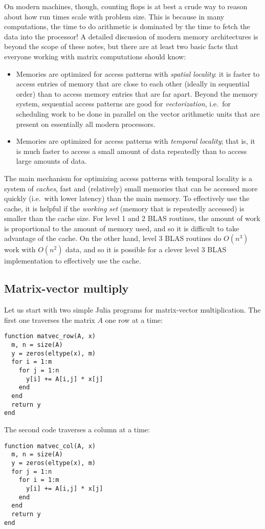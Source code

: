 \documentclass[12pt, leqno]{article}
\begin{document}
On modern machines, though, counting flops is at best a crude way
to reason about how run times scale with problem size.  This is because
in many computations, the time to do arithmetic is dominated by the time
to fetch the data into the processor!  A detailed discussion of modern
memory architectures is beyond the scope of these notes, but there are
at least two basic facts that everyone working with matrix computations
should know:
\begin{itemize}
\item
  Memories are optimized for access patterns with {\em spatial locality}:
  it is faster to access entries of memory that are close to each
  other (ideally in sequential order) than to access memory entries that
  are far apart.  Beyond the memory system, sequential access patterns
  are good for {\em vectorization}, i.e.~for scheduling work to be done
  in parallel on the vector arithmetic units
  that are present on essentially all modern processors.
\item
  Memories are optimized for access patterns with {\em temporal locality};
  that is, it is much faster to access a small amount of data repeatedly
  than to access large amounts of data.
\end{itemize}

The main mechanism for optimizing access patterns with temporal locality
is a system of {\em caches}, fast and (relatively) small memories that can
be accessed more quickly (i.e.~with lower latency) than the main memory.
To effectively use the cache, it is helpful if the {\em working set}
(memory that is repeatedly accessed) is smaller than the cache size.
For level 1 and 2 BLAS routines, the amount of work is proportional to
the amount of memory used, and so it is difficult to take advantage of
the cache.  On the other hand, level 3 BLAS routines do $O(n^3)$ work
with $O(n^2)$ data, and so it is possible for a clever level 3 BLAS
implementation to effectively use the cache.

\subsection{Matrix-vector multiply}

Let us start with two simple Julia programs for matrix-vector
multiplication.  The first one traverses the matrix $A$ one row at a time:
\begin{lstlisting}
function matvec_row(A, x)
  m, n = size(A)
  y = zeros(eltype(x), m)
  for i = 1:m
    for j = 1:n
      y[i] += A[i,j] * x[j]
    end
  end
  return y
end
\end{lstlisting}
The second code traverses a column at a time:
\begin{lstlisting}
function matvec_col(A, x)
  m, n = size(A)
  y = zeros(eltype(x), m)
  for j = 1:n
    for i = 1:m
      y[i] += A[i,j] * x[j]
    end
  end
  return y
end
\end{lstlisting}
\end{document}
